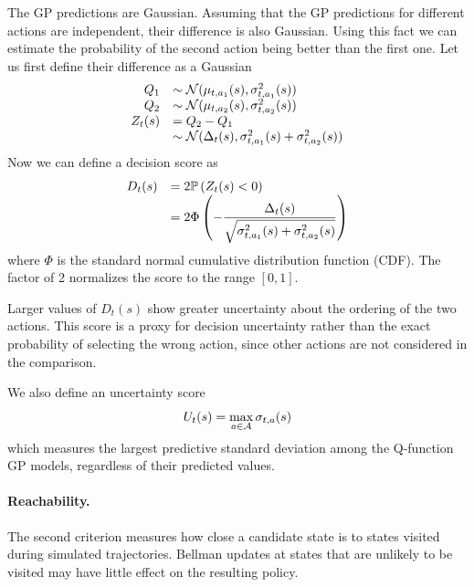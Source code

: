 The GP predictions are Gaussian. Assuming that the GP predictions for different actions are independent, their difference is also Gaussian. Using this fact we can estimate the probability of the second action being better than the first one. Let us first define their difference as a Gaussian
\begin{equation}
	\begin{array}{rl}
		Q_1 & \sim \mathcal{N}(\mu_{t, a_1}(s), \sigma_{t, a_1}^2(s)) \\
		Q_2 & \sim \mathcal{N}(\mu_{t, a_2}(s), \sigma_{t, a_2}^2(s)) \\
		Z_t(s) & = Q_2 - Q_1 \\
		& \sim \mathcal{N}(\Delta_t(s), \sigma_{t, a_1}^2(s) + \sigma_{t, a_2}^2(s))
	\end{array}
	\notag
	\label{action-difference-distribution}
\end{equation}
Now we can define a decision score as
\begin{equation}
	\begin{array}{rl}
		D_t(s) &= 2 \mathbb{P} \left( Z_t(s) < 0 \right) \\
		& \displaystyle = 2 \Phi \left( -\frac{\Delta_t(s)}{\sqrt{\sigma_{t, a_1}^2(s) + \sigma_{t, a_2}^2(s)}} \right)
	\end{array}
	\label{decision-score}
\end{equation}
where $\Phi$ is the standard normal cumulative distribution function (CDF). The factor of 2 normalizes the score to the range $[0,1]$.

Larger values of $D_t(s)$ show greater uncertainty about the ordering of the two actions. This score is a proxy for decision uncertainty rather than the exact probability of selecting the wrong action, since other actions are not considered in the comparison.

We also define an uncertainty score
\begin{equation}
	U_t(s) = \max_{a \in \mathcal{A}} \sigma_{t, a}(s)
	\label{uncertainty-score}
\end{equation}
which measures the largest predictive standard deviation among the Q-function GP models, regardless of their predicted values.

\paragraph{Reachability.}

The second criterion measures how close a candidate state is to states visited during simulated trajectories. Bellman updates at states that are unlikely to be visited may have little effect on the resulting policy.

